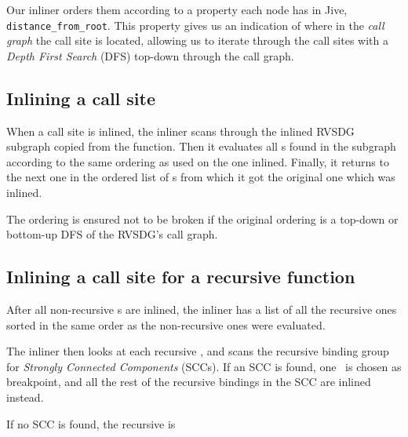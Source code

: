 Our inliner orders them according to a property each node has in Jive,
\lstinline!distance_from_root!. This property gives us an indication of where in
the \textit{call graph} the call site is located, allowing us to iterate through
the call sites with a \textit{Depth First
Search} (DFS) top-down through the call graph.

\subsection{Inlining a call site}
\label{sub:scheme:inlining_apply_nodes}


When a call site is inlined, the inliner scans through the inlined RVSDG
subgraph copied from the function. Then it evaluates all \applyNode s found in
the subgraph according to the same ordering as used on the one inlined. Finally,
it returns to the next one in the ordered list of \applyNode s from which it got
the original one which was inlined.

The ordering is ensured not to be broken if the original ordering is a top-down
or bottom-up DFS of the RVSDG's call graph.

\subsection{Inlining a call site for a recursive function}
\label{sub:scheme:inlining_recur_apply_nodes}


After all non-recursive \applyNode s are inlined, the inliner has a list of all
the recursive ones sorted in the same order as the non-recursive ones were
evaluated.

The inliner then looks at each recursive \applyNode , and scans the recursive
binding group for \textit{Strongly Connected Components} (SCCs). If an SCC is
found, one \applyNode~is chosen as breakpoint,
and all the rest of the recursive bindings in the SCC are inlined instead.

If no SCC is found, the recursive \applyNode is
